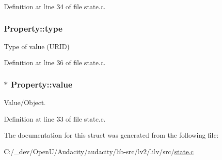 Definition at line 34 of file state.\+c.

\subsubsection[{\texorpdfstring{type}{type}}]{ Property\+::type}\hypertarget{struct_property_adb514bcdfd564833e3a30c80f54f3de9}{}\label{struct_property_adb514bcdfd564833e3a30c80f54f3de9}


Type of value (U\+R\+ID) 



Definition at line 36 of file state.\+c.

\subsubsection[{\texorpdfstring{value}{value}}]{$\ast$ Property\+::value}\hypertarget{struct_property_a4a926eea767e932bfb1da724b43f1463}{}\label{struct_property_a4a926eea767e932bfb1da724b43f1463}


Value/\+Object. 



Definition at line 33 of file state.\+c.



The documentation for this struct was generated from the following file\+:\begin{DoxyCompactItemize}
\item 
C\+:/\+\_\+dev/\+Open\+U/\+Audacity/audacity/lib-\/src/lv2/lilv/src/\hyperlink{state_8c}{state.\+c}\end{DoxyCompactItemize}
